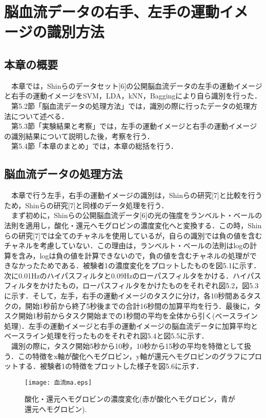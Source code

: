 \documentclass[a4j,12pt]{jreport}
\begin{document}
\chapter{脳血流データの右手、左手の運動イメージの識別方法}
\section{本章の概要}
　本章では，Shinらのデータセット[6]の公開脳血流データの左手の運動イメージと右手の運動イメージをSVM，LDA，kNN，Baggingにより自ら識別を行った．\\
　第5.2節「脳血流データの処理方法」では，識別の際に行ったデータの処理方法について述べる．\\
　第5.3節「実験結果と考察」では，左手の運動イメージと右手の運動イメージの識別結果について説明した後，考察を行う．\\
　第5.4節「本章のまとめ」では，本章の総括を行う．\\
\section{脳血流データの処理方法}
　本章で行う左手，右手の運動イメージの識別は，Shinらの研究[7]と比較を行うため，Shinらの研究[7]と同様のデータ処理を行う．\\
　まず初めに，Shinらの公開脳血流データ[6]の光の強度をランベルト・ベールの法則を適用し，酸化・還元ヘモグロビンの濃度変化へと変換する．この時，Shinらの研究[7]では全てのチャネルを使用しているが，自らの識別では負の値を含むチャネルを考慮していない．この理由は，ランベルト・ベールの法則はlogの計算を含み，logは負の値を計算できないので，負の値を含むチャネルの処理ができなかったためである．被験者1の濃度変化をプロットしたものを図5.1に示す．次に0.01Hzのハイパスフィルタと0.09Hzのローパスフィルタをかける．ハイパスフィルタをかけたもの，ローパスフィルタをかけたものをそれぞれ図5.2，図5.3に示す．そして，左手，右手の運動イメージのタスクに分け，各10秒間あるタスクの，開始1秒前から終了5秒後までの合計16秒間の加算平均を行う．最後に，タスク開始1秒前からタスク開始までの1秒間の平均を全体から引く(ベースライン処理)．左手の運動イメージと右手の運動イメージの脳血流データに加算平均とベースライン処理を行ったものをそれぞれ図5.4と図5.5に示す．\\
　識別の際に，タスク開始5秒から10秒，10秒から15秒の平均を特徴として扱う．この特徴をx軸が酸化ヘモグロビン，y軸が還元ヘモグロビンのグラフにプロットする．被験者1の特徴をプロットした様子を図5.6に示す．\\

\begin{figure}[t]
  \begin{center}
    \texttt{[image: 血流ma.eps]}
    \caption{酸化・還元ヘモグロビンの濃度変化(赤が酸化ヘモグロビン，青が還元ヘモグロビン).}
    \label{fig}
  \end{center}
\end{figure}
\end{document}
